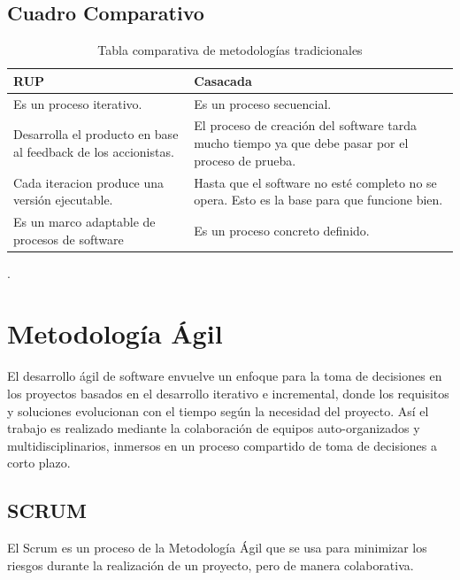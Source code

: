 


\subsection{Cuadro Comparativo}

\begin{table}[H]	
\begin{center}
\begin{tabular}{ | m{6cm} | m{6cm} | } 
  \hline
 RUP & Casacada \\
 \hline
 Es un proceso iterativo.  & Es un proceso secuencial.  \\
 \hline
 Desarrolla el producto en base al feedback de los accionistas.  &   El proceso de creación del software tarda mucho tiempo ya que debe pasar por el proceso de prueba. \\
 \hline
  Cada iteracion produce una versión ejecutable. & Hasta que el software no esté completo no se opera. Esto es la base para que funcione bien. \\
 \hline
  Es un marco adaptable de procesos de software & Es un proceso concreto definido. \\
 \hline
\end{tabular}
\caption{Tabla comparativa de metodologías tradicionales}
\label{Tabla:1}
\end{center}
\end{table}	
.


\section{Metodología Ágil} 

El desarrollo ágil de software envuelve un enfoque para la toma de decisiones en los proyectos basados en el desarrollo iterativo e incremental, donde los requisitos y soluciones evolucionan con el tiempo según la necesidad del proyecto. Así el trabajo es realizado mediante la colaboración de equipos auto-organizados y multidisciplinarios, inmersos en un proceso compartido de toma de decisiones a corto plazo.


\subsection{SCRUM}
\setlength{\parskip}{5mm}
El Scrum es un proceso de la Metodología Ágil que se usa para minimizar los riesgos durante la realización de un proyecto, pero de manera colaborativa. 

